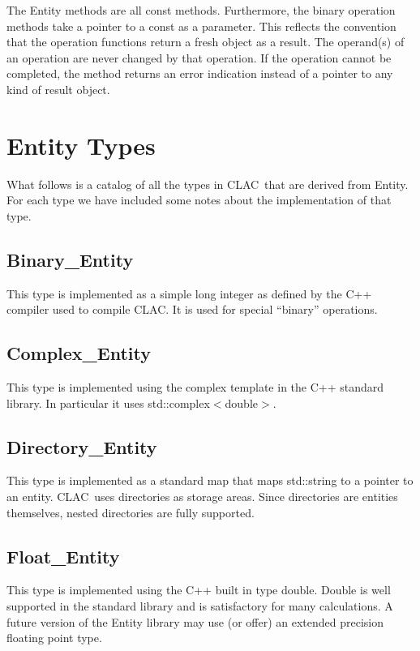 \documentclass{report}
\newcommand{\CLAC}{CLAC}
\begin{document}
The Entity methods are all const methods. Furthermore, the binary operation methods take a pointer to a const as a parameter. This reflects the convention that the operation functions return a fresh object as a result. The operand(s) of an operation are never changed by that operation. If the operation cannot be completed, the method returns an error indication instead of a pointer to any kind of result object.

\section{Entity Types}

What follows is a catalog of all the types in \CLAC\ that are derived from Entity. For each type we have included some notes about the implementation of that type.

\subsection{Binary\_Entity}

This type is implemented as a simple long integer as defined by the C++ compiler used to compile \CLAC. It is used for special ``binary'' operations.

\subsection{Complex\_Entity}

This type is implemented using the complex template in the C++ standard library. In particular it uses std::complex$<$double$>$.

\subsection{Directory\_Entity}

This type is implemented as a standard map that maps std::string to a pointer to an entity. \CLAC\ uses directories as storage areas. Since directories are entities themselves, nested directories are fully supported.

\subsection{Float\_Entity}

This type is implemented using the C++ built in type double. Double is well supported in the standard library and is satisfactory for many calculations. A future version of the Entity library may use (or offer) an extended precision floating point type.
\end{document}
